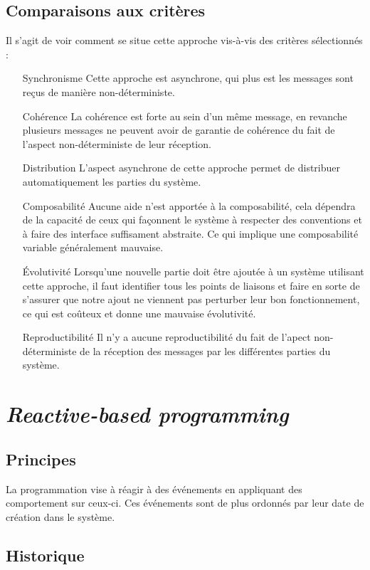 \documentclass{article}
\begin{document}
\subsection{Comparaisons aux critères}
Il s'agit de voir comment se situe cette approche vis-à-vis des critères sélectionnés :  
\begin{itemize}
    \item[Synchronisme] Cette approche est asynchrone, qui plus est les messages
sont reçus de  manière non-déterministe.
    \item[Cohérence] La cohérence est forte au sein d'un même message, en revanche
plusieurs messages ne peuvent avoir de garantie de cohérence du fait de l'aspect
non-déterministe de leur réception.
    \item[Distribution] L'aspect asynchrone de cette approche permet de distribuer
automatiquement les parties du système.  
    \item[Composabilité] Aucune aide n'est apportée à la composabilité, cela dépendra
de la capacité de ceux qui façonnent le système à respecter des conventions et à
faire des interface suffisament abstraite. Ce qui implique une composabilité variable
généralement mauvaise.
    \item[Évolutivité] Lorsqu'une nouvelle partie doit être ajoutée à un système
utilisant cette approche, il faut identifier tous les points de liaisons et faire
en sorte de s'assurer que notre ajout ne viennent pas perturber leur bon fonctionnement,
ce qui est coûteux et donne une mauvaise évolutivité.
    \item[Reproductibilité] Il n'y a aucune reproductibilité du fait de l'apect
non-déterministe de la réception des messages par les différentes parties du système.
\end{itemize}


\section{\emph{Reactive-based programming}}\label{reactive}

\subsection{Principes}\label{principes-1}

La programmation vise à réagir à des événements en appliquant des
comportement sur ceux-ci. Ces événements sont de plus ordonnés par
leur date de création dans le système.

\subsection{Historique}\label{historique-1}
\end{document}
